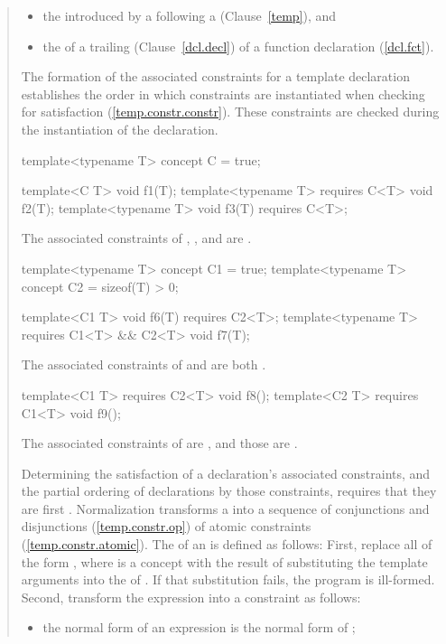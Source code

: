 \begin{quote}
\begin{addedblock}
\begin{itemize}
\begin{itemize}
\item the  introduced
      by a  following a 
       (Clause~\ref{temp}), and

\item the  of a trailing 
       (Clause~\ref{dcl.decl}) 
      of a function declaration (\ref{dcl.fct}).
\end{itemize}
\end{itemize}
% 
The formation of the associated constraints for a template declaration
establishes the order in which constraints are instantiated when checking 
for satisfaction (\ref{temp.constr.constr}).
% 
\enternote
These constraints are checked during the instantiation of the declaration.
\exitnote
% 
\enterexample
\begin{codeblock}
template<typename T> concept C = true;

template<C T> void f1(T);
template<typename T> requires C<T> void f2(T);
template<typename T> void f3(T) requires C<T>;
\end{codeblock}
The associated constraints of , , and 
are .
% 
\begin{codeblock}
template<typename T> concept C1 = true;
template<typename T> concept C2 = sizeof(T) > 0;

template<C1 T> void f6(T) requires C2<T>;
template<typename T> requires C1<T> && C2<T> void f7(T);
\end{codeblock}
The associated constraints of  and  are both
.
% 
\begin{codeblock}
template<C1 T> requires C2<T> void f8();
template<C2 T> requires C1<T> void f9();
\end{codeblock}
% 
The associated constraints of  are
, and those  are
.
\exitexample

\pnum
Determining the satisfaction of a declaration's associated constraints,
and the partial ordering of declarations by those constraints,
requires that they are first .
% 
Normalization transforms a  into a sequence of 
conjunctions and disjunctions (\ref{temp.constr.op})
of atomic constraints (\ref{temp.constr.atomic}).
% 
The  of an   is 
defined as follows:
% 
First, replace all  of the form 
, where  is a concept with the 
result of substituting the template arguments  
into the  of .
% 
If that substitution fails, the program is ill-formed.
% 
Second, transform the expression  into a constraint as follows:
\begin{itemize}
\item the normal form of an expression  is the normal form
of ;


\end{itemize}
\end{addedblock}
\end{quote}
